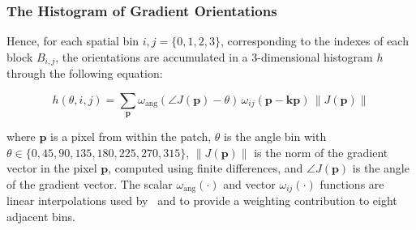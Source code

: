 \documentclass[aspectratio=169]{beamer}
\begin{document}
\begin{frame}
\frametitle{The Histogram of Gradient Orientations}
\begin{center}
Hence, for each spatial bin $ i,j = \{0,1,2,3\} $, corresponding to the indexes of each block $B_{i,j}$,  the orientations are accumulated in a  $3$-dimensional histogram $h$ through the following equation: 
 

\begin{equation}
 h(\theta,i,j) = \sum_{\mathbf{p}} \omega_\mathrm{ang}(\angle J(\mathbf{p}) - \theta)\, \omega_{ij}\left(\mathbf{p} - \mathbf{kp} \right)\, \left\lVert J(\mathbf{p})\right\rVert 
\label{eq:histogram}
\end{equation}

\noindent  where $\mathbf{p}$ is a pixel from within the patch,  $\theta$ is the angle bin with $ \theta \in \{0, 45, 90, 135, 180, 225, 270, 315\} $,  $ \left\lVert J(\mathbf{p}) \right\rVert $ is the norm of the gradient vector in the pixel $\mathbf{p}$, computed using finite differences, and $\angle J(\mathbf{p}) $ is the angle of the gradient vector.  The scalar $ \omega_\mathrm{ang}(\cdot) $  and vector $ \omega_{ij}(\cdot) $ functions are linear interpolations used by~ and  to provide a weighting contribution to eight adjacent bins. 
\end{center}
\end{frame}
\end{document}
